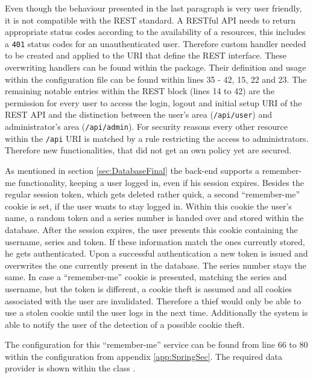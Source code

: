 Even though the behaviour presented in the last paragraph is very user friendly, it is not compatible with the \gls{REST} standard. A \gls{REST}ful \gls{API} needs to return appropriate status codes according to the availability of a resources, this includes a \texttt{401} status codes for an unauthenticated user. Therefore custom handler needed to be created and applied to the \gls{URI} that define the \gls{REST} interface. These overwriting handlers can be found within the  package. Their definition and usage within the configuration file can be found within lines 35 - 42, 15, 22 and 23. The remaining notable entries within the \gls{REST} block (lines 14 to 42) are the permission for every user to access the login, logout and initial setup \gls{URI} of the \gls{REST} \gls{API} and the distinction between the user's area (\texttt{/api/user}) and administrator's area (\texttt{/api/admin}). For security reasons every other resource within the \texttt{/api} \gls{URI} is matched by a rule restricting the access to administrators. Therefore new functionalities, that did not get an own policy yet are secured.

As mentioned in section \vref{sec:DatabaseFinal} the back-end supports a remember-me functionality, keeping a user logged in, even if his session expires. Besides the regular session token, which gets deleted rather quick, a second \enquote{remember-me} cookie is set, if the user wants to stay logged in. Within this cookie the user's name, a random token and a series number is handed over and stored within the database. After the session expires, the user presents this cookie containing the username, series and token. If these information match the ones currently stored, he gets authenticated. Upon a successful authentication a new token is issued and overwrites the one currently present in the database. The series number stays the same. In case a \enquote{remember-me} cookie is presented, matching the series and username, but the token is different, a cookie theft is assumed and all cookies associated with the user are invalidated. Therefore a thief would only be able to use a stolen cookie until the user logs in the next time. Additionally the system is able to notify the user of the detection of a possible cookie theft. \cite{Jaspan:2006aa}

The configuration for this \enquote{remember-me} service can be found from line 66 to 80 within the configuration from appendix \vref{app:SpringSec}. The required data provider is shown within the class .

